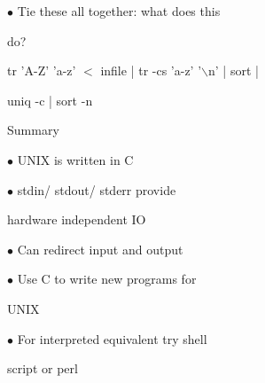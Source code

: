 \documentclass[a4paper,portrait,12pt]{article}
\begin{document}
\begin{flushleft}
$\bullet$ Tie these all together: what does this
\end{flushleft}


\begin{flushleft}
do?
\end{flushleft}


\begin{flushleft}
tr 'A-Z' 'a-z' $<$ infile | tr -cs 'a-z' '\ensuremath{\backslash}n' | sort |
\end{flushleft}


\begin{flushleft}
uniq -c | sort -n
\end{flushleft}





\begin{flushleft}
\newpage
Summary
\end{flushleft}


\begin{flushleft}
$\bullet$ UNIX is written in C
\end{flushleft}


\begin{flushleft}
$\bullet$ stdin/ stdout/ stderr provide
\end{flushleft}


\begin{flushleft}
hardware independent IO
\end{flushleft}


\begin{flushleft}
$\bullet$ Can redirect input and output
\end{flushleft}


\begin{flushleft}
$\bullet$ Use C to write new programs for
\end{flushleft}


\begin{flushleft}
UNIX
\end{flushleft}


\begin{flushleft}
$\bullet$ For interpreted equivalent try shell
\end{flushleft}


\begin{flushleft}
script or perl
\end{flushleft}
\end{document}
